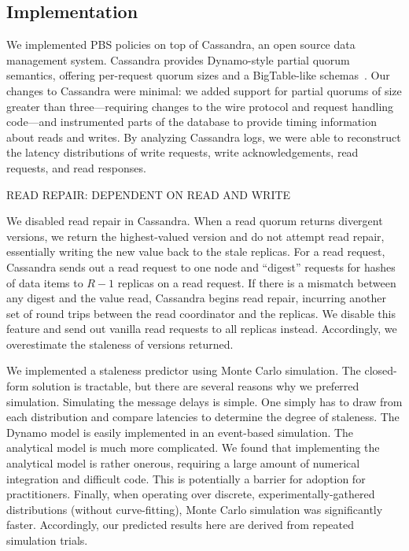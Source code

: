 \documentclass{vldb}
\begin{document}
\subsection{Implementation}

We implemented PBS policies on top of Cassandra, an open source data
management system.  Cassandra provides Dynamo-style partial quorum
semantics, offering per-request quorum sizes and a BigTable-like
schemas~\cite{needed}.  Our changes to Cassandra were minimal: we
added support for partial quorums of size greater than
three---requiring changes to the wire protocol and request handling
code---and instrumented parts of the database to provide timing
information about reads and writes.  By analyzing Cassandra logs, we
were able to reconstruct the latency distributions of write requests,
write acknowledgements, read requests, and read responses.

READ REPAIR: DEPENDENT ON READ AND WRITE

We disabled read repair in Cassandra.  When a read quorum returns
divergent versions, we return the highest-valued version and do not
attempt read repair, essentially writing the new value back to the
stale replicas.  For a read request, Cassandra sends out a read
request to one node and ``digest'' requests for hashes of data items
to $R-1$ replicas on a read request.  If there is a mismatch between
any digest and the value read, Cassandra begins read repair, incurring
another set of round trips between the read coordinator and the
replicas.  We disable this feature and send out vanilla read requests
to all replicas instead.  Accordingly, we overestimate the staleness
of versions returned.

We implemented a staleness predictor using Monte Carlo simulation.
The closed-form solution is tractable, but there are several reasons
why we preferred simulation.  Simulating the message delays is simple.
One simply has to draw from each distribution and compare latencies to
determine the degree of staleness.  The Dynamo model is easily
implemented in an event-based simulation.  The analytical model is
much more complicated.  We found that implementing the analytical
model is rather onerous, requiring a large amount of numerical
integration and difficult code.  This is potentially a barrier for
adoption for practitioners.  Finally, when operating over discrete,
experimentally-gathered distributions (without curve-fitting), Monte
Carlo simulation was significantly faster.  Accordingly, our predicted
results here are derived from repeated simulation trials.
\end{document}
